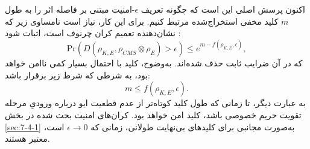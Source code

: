 اکنون پرسش اصلی این است که چگونه تعریف $\epsilon$-امنیت مبتنی بر فاصله اثر را به طول $m$ کلید مخفی استخراج‌شده مرتبط کنیم. برای این کار، نیاز است نامساوی زیر که نشان‌دهنده تعمیم کران چرنوف است، اثبات شود \cite{7-46}:
\begin{equation}
	\text{Pr} \left( D(\rho_{K,E}, \rho_{CMS} \otimes \rho_E) > \epsilon \right) \leq e^{m - f(\rho_{K,E}, \epsilon)},
	\label{eq:7-41}
\end{equation}
که در آن ضرایب ثابت حذف شده‌اند. به‌وضوح، کلید با احتمال بسیار کمی ناامن خواهد بود، به شرطی که شرط زیر برقرار باشد:
\begin{equation}
	m \leq f(\rho_{K,E}, \epsilon).
	\label{eq:7-42}
\end{equation}
به عبارت دیگر، تا زمانی که طول کلید کوتاه‌تر از عدم قطعیت ایو درباره ورودیِ مرحله تقویت حریم خصوصی باشد، کلید امن خواهد بود. کران‌های امنیت بحث شده در بخش \ref{sec:7-4-1} به‌صورت مجانبی برای کلیدهای بی‌نهایت طولانی، زمانی که $\epsilon \to 0$ است، معتبر هستند.








